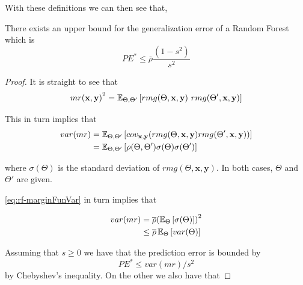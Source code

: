 With these definitions we can then see that,

\begin{theorem}
    There exists an upper bound for the generalization error of a Random Forest which is    \begin{equation}\label{eq:rf-PEBound}
    PE^* \leq \overline{\rho}\frac{(1-s^2)}{s^2}
    \end{equation}
\end{theorem}


\begin{proof}


    It is straight to see that
    \begin{equation}
    {mr( \textbf{x},\textbf{y} )}^2 = \Expect_{\Theta, \Theta'} \left[ rmg( \Theta,\textbf{x},\textbf{y} ) \ rmg(\Theta',\textbf{x},\textbf{y} ) \right]
    \end{equation}


    This in turn implies that
    \begin{equation}\label{eq:rf-marginFunVar}
    \begin{split}
    var(mr) & = \operatorname{\mathbb{E}}_{\Theta, \Theta'}
    \left[
    cov_{\textbf{x},\textbf{y}}
    (rmg(\Theta,\textbf{x},\textbf{y} )rmg(\Theta',\textbf{x},\textbf{y} ))
    \right] \\
    & = \operatorname{\mathbb{E}}_{\Theta, \Theta'}
    \left[
    \rho(\Theta, \Theta')\sigma(\Theta)\sigma(\Theta')
    \right]
    \end{split}
    \end{equation}

    where $\sigma(\Theta)$ is the standard deviation of $rmg(\Theta,\textbf{x},\textbf{y})$.
    In both cases, $\Theta$ and $\Theta'$ are given.%

    \cref{eq:rf-marginFunVar} in turn implies that

    \begin{equation}\label{eq:rf-varianceBound}
    \begin{split}
    var(mr) & = \overline{\rho} {(\operatorname{\mathbb{E}}_{\Theta}\left[ \sigma(\Theta)\right] )}^2 \\
    & \leq \overline{\rho} \operatorname{\mathbb{E}}_{\Theta} \left[ var(\Theta) \right]
    \end{split}
    \end{equation}


    Assuming that $s \geq 0$ we have that the prediction error is bounded by
    \begin{equation}\label{eq:rf-predictiveErrorBound1}
    PE^* \leq var(mr)/s^2
    \end{equation}
    by Chebyshev's inequality.
    On the other we also have that


\end{proof}
